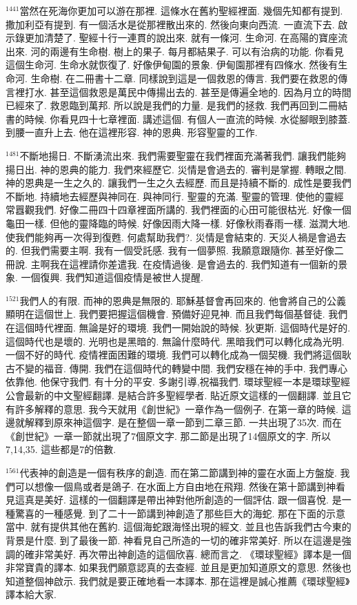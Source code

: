 \documentclass{book}
\begin{document}
$^{1441}$當然在死海你更加可以游在那裡.
這條水在舊約聖經裡面.
幾個先知都有提到.
撒加利亞有提到.
有一個活水是從那裡散出來的.
然後向東向西流.
一直流下去.
啟示錄更加清楚了.
聖經十行一連貫的說出來.
就有一條河.
生命河.
在高陽的寶座流出來.
河的兩邊有生命樹.
樹上的果子.
每月都結果子.
可以有治病的功能.
你看見這個生命河.
生命水就恢復了.
好像伊甸園的景象.
伊甸園那裡有四條水.
然後有生命河.
生命樹.
在二冊書十二章.
同樣說到這是一個救恩的傳言.
我們要在救恩的傳言裡打水.
甚至這個救恩是萬民中傳揚出去的.
甚至是傳遍全地的.
因為月立的時間已經來了.
救恩臨到萬邦.
所以說是我們的力量.
是我們的拯救.
我們再回到二冊結書的時候.
你看見四十七章裡面.
講述這個.
有個人一直流的時候.
水從腳眼到膝蓋.
到腰一直升上去.
他在這裡形容.
神的恩典.
形容聖靈的工作.

$^{1481}$不斷地揚日.
不斷湧流出來.
我們需要聖靈在我們裡面充滿著我們.
讓我們能夠揚日出.
神的恩典的能力.
我們來經歷它.
災情是會過去的.
審判是掌握.
轉眼之間.
神的恩典是一生之久的.
讓我們一生之久去經歷.
而且是持續不斷的.
成性是要我們不斷地.
持續地去經歷與神同在.
與神同行.
聖靈的充滿.
聖靈的管理.
使他的靈經常囂觀我們.
好像二冊四十四章裡面所講的.
我們裡面的心田可能很枯光.
好像一個龜田一樣.
但他的靈降臨的時候.
好像因雨大降一樣.
好像秋雨春雨一樣.
滋潤大地.
使我們能夠再一次得到復甦.
何處幫助我們?.
災情是會結束的.
天災人禍是會過去的.
但我們需要主啊.
我有一個受託感.
我有一個夢照.
我願意跟隨你.
甚至好像二冊說.
主啊我在這裡請你差遣我.
在疫情過後.
是會過去的.
我們知道有一個新的景象.
一個復興.
我們知道這個疫情是被世人提醒.

$^{1521}$我們人的有限.
而神的恩典是無限的.
耶穌基督會再回來的.
他會將自己的公義顯明在這個世上.
我們要把握這個機會.
預備好迎見神.
而且我們每個基督徒.
我們在這個時代裡面.
無論是好的環境.
我們一開始說的時候.
狄更斯.
這個時代是好的.
這個時代也是壞的.
光明也是黑暗的.
無論什麼時代.
黑暗我們可以轉化成為光明.
一個不好的時代.
疫情裡面困難的環境.
我們可以轉化成為一個契機.
我們將這個耿古不變的福音.
傳開.
我們在這個時代的轉變中間.
我們安穩在神的手中.
我們專心依靠他.
他保守我們.
有十分的平安.
多謝引導,祝福我們.
環球聖經一本是環球聖經公會最新的中文聖經翻譯.
是結合許多聖經學者.
貼近原文這樣的一個翻譯.
並且它有許多解釋的意思.
我今天就用《創世紀》一章作為一個例子.
在第一章的時候.
這邊就解釋到原來神這個字.
是在整個一章一節到二章三節.
一共出現了35次.
而在《創世紀》一章一節就出現了7個原文字.
那二節是出現了14個原文的字.
所以7,14,35.
這些都是7的倍數.

$^{1561}$代表神的創造是一個有秩序的創造.
而在第二節講到神的靈在水面上方盤旋.
我們可以想像一個鳥或者是鴿子.
在水面上方自由地在飛翔.
然後在第十節講到神看見這真是美好.
這樣的一個翻譯是帶出神對他所創造的一個評估.
跟一個喜悅.
是一種驚喜的一種感覺.
到了二十一節講到神創造了那些巨大的海蛇.
那在下面的示意當中.
就有提供其他在舊約.
這個海蛇跟海怪出現的經文.
並且也告訴我們古今東的背景是什麼.
到了最後一節.
神看見自己所造的一切的確非常美好.
所以在這邊是強調的確非常美好.
再次帶出神創造的這個欣喜.
總而言之.
《環球聖經》譯本是一個非常寶貴的譯本.
如果我們願意認真的去查經.
並且是更加知道原文的意思.
然後也知道整個神啟示.
我們就是要正確地看一本譯本.
那在這裡是誠心推薦《環球聖經》譯本給大家.
\newpage
\end{document}
